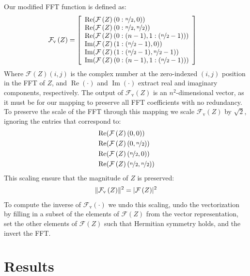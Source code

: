 \documentclass[10pt,twocolumn,letterpaper]{article}
\DeclarePairedDelimiter{\abs}{\lvert}{\rvert}
\DeclarePairedDelimiter{\norm}{\lVert}{\rVert}
\newcommand{\fftv}[1]{\mathcal{F}_\mathrm{v} \left( #1 \right)}
\newcommand{\fft}[1]{\mathcal{F}\left( #1 \right )}
\begin{document}
Our modified FFT function is defined as:
\begin{align}
\fftv{Z} &= \left[ \begin{array}{l}
\operatorname {Re} (\fft{Z}(0 : \nicefrac{n}{2}, 0)) \\
\operatorname {Re} (\fft{Z}(0 : \nicefrac{n}{2}, \nicefrac{n}{2})) \\
\operatorname {Re} (\fft{Z}(0 : (n-1), 1:(\nicefrac{n}{2}-1))) \\
\operatorname {Im} (\fft{Z}(1 : (\nicefrac{n}{2}-1), 0)) \\
\operatorname {Im} (\fft{Z}(1 : (\nicefrac{n}{2}-1), \nicefrac{n}{2}-1)) \\
\operatorname {Im} (\fft{Z}(0 : (n-1), 1:(\nicefrac{n}{2}-1))) \\
\end{array} \right]
\end{align}
Where $\fft{Z}(i, j)$ is the complex number at the zero-indexed $(i,j)$
position in the FFT of $Z$, and
 $\operatorname {Re}(\cdot)$ and
$\operatorname {Im}(\cdot)$ extract real and imaginary components, respectively.
The output of $\fftv{Z}$ is an $n^2$-dimensional vector, as it must be for our
mapping to preserve all FFT coefficients with no redundancy.
To preserve the scale of the FFT through this mapping we scale $\fftv{Z}$ by
$\sqrt{2}$, ignoring the entries that correspond to:
\begin{align}
&\operatorname {Re}(\fft{Z}(0, 0)) \nonumber \\
&\operatorname {Re}(\fft{Z}(0, \nicefrac{n}{2})) \nonumber \\
&\operatorname {Re}(\fft{Z}(\nicefrac{n}{2}, 0)) \nonumber \\
&\operatorname {Re}(\fft{Z}(\nicefrac{n}{2}, \nicefrac{n}{2}))
\end{align}
This scaling ensure that the magnitude of $Z$ is preserved:
\begin{equation}
\norm{\fftv{Z}}^2 = \abs{\fft{Z}}^2
\end{equation}
To compute the inverse of $\fftv{\cdot}$ we
undo this scaling,
undo the vectorization by filling in a subset of the elements of
$\fft{Z}$ from the vector representation,
set the other elements of $\fft{Z}$ such that Hermitian symmetry holds,
and the invert the FFT.

\section{Results}
\end{document}
